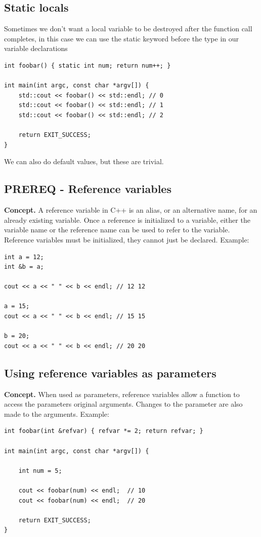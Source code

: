\documentclass{report}
\begin{document}
    \pagebreak \bigbreak \noindent 
    \subsection{Static locals}
    \bigbreak \noindent 
    Sometimes we don't want a local variable to be destroyed after the function call completes, in this case we can use the static keyword before the type in our variable declarations
    \bigbreak \noindent 
    \sepline
    \begin{verbatim}
int foobar() { static int num; return num++; }

int main(int argc, const char *argv[]) {
    std::cout << foobar() << std::endl; // 0
    std::cout << foobar() << std::endl; // 1
    std::cout << foobar() << std::endl; // 2

    return EXIT_SUCCESS;
}
    \end{verbatim}
    \sepline

    \bigbreak \noindent 
    We can also do default values, but these are trivial.

    \bigbreak \noindent 
    \subsection{PREREQ - Reference variables}
    \bigbreak \noindent 
    \textbf{Concept.} A reference variable in C++ is an alias, or an alternative name, for an already existing variable. Once a reference is initialized to a variable, either the variable name or the reference name can be used to refer to the variable. Reference variables must be initialized, they cannot just be declared.
    \bigbreak \noindent 
    Example:
    \bigbreak \noindent 
    \sepline
    \begin{verbatim}
int a = 12;
int &b = a; 

cout << a << " " << b << endl; // 12 12

a = 15;
cout << a << " " << b << endl; // 15 15

b = 20; 
cout << a << " " << b << endl; // 20 20

    \end{verbatim}
    \sepline

    \pagebreak \bigbreak \noindent 
    \subsection{Using reference variables as parameters}
    \bigbreak \noindent 
    \textbf{Concept.} When used as parameters, reference variables allow a function to access the parameters original arguments. Changes to the parameter are also made to the arguments.
    \bigbreak \noindent 
    Example:
    \bigbreak \noindent 
    \sepline
    \begin{verbatim}
int foobar(int &refvar) { refvar *= 2; return refvar; }

int main(int argc, const char *argv[]) {
    
    int num = 5;

    cout << foobar(num) << endl;  // 10
    cout << foobar(num) << endl;  // 20

    return EXIT_SUCCESS;
}
    \end{verbatim}
    \sepline
    
\end{document}

